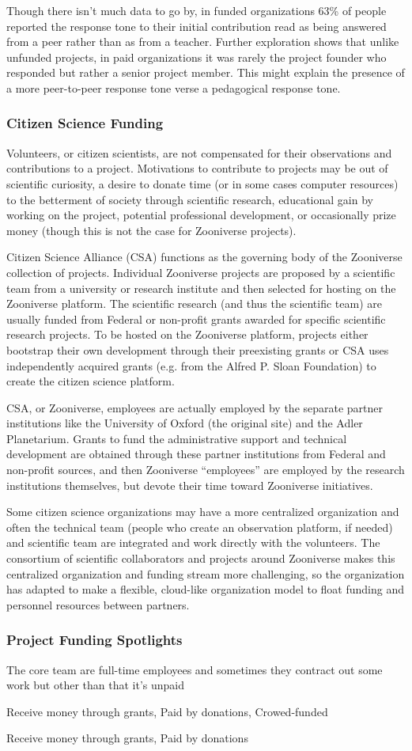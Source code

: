 Though there isn't much data to go by, in funded organizations 63\% of people reported the response tone to their initial contribution read as being answered from a peer rather than as from a teacher. Further exploration shows that unlike unfunded projects, in paid organizations it was rarely the project founder who responded but rather a senior project member. This might explain the presence of a more peer-to-peer response tone verse a pedagogical response tone.

\subsubsection{Citizen Science Funding}
Volunteers, or citizen scientists, are not compensated for their observations and contributions to a project. Motivations to contribute to projects may be out of scientific curiosity, a desire to donate time (or in some cases computer resources) to the betterment of society through scientific research, educational gain by working on the project, potential professional development, or occasionally prize money (though this is not the case for Zooniverse projects).
 
Citizen Science Alliance (CSA) functions as the governing body of the Zooniverse collection of projects. Individual Zooniverse projects are proposed by a scientific team from a university or research institute and then selected for hosting on the Zooniverse platform. The scientific research (and thus the scientific team) are usually funded from Federal or non-profit grants awarded for specific scientific research projects. To be hosted on the Zooniverse platform, projects either bootstrap their own development through their preexisting grants or CSA uses independently acquired grants (e.g. from the Alfred P. Sloan Foundation) to create the citizen science platform.
 
CSA, or Zooniverse, employees are actually employed by the separate partner institutions like the University of Oxford (the original site) and the Adler Planetarium. Grants to fund the administrative support and technical development are obtained through these partner institutions from Federal and non-profit sources, and then Zooniverse “employees” are employed by the research institutions themselves, but devote their time toward Zooniverse initiatives.
 
Some citizen science organizations may have a more centralized organization and often the technical team (people who create an observation platform, if needed) and scientific team are integrated and work directly with the volunteers. The consortium of scientific collaborators and projects around Zooniverse makes this centralized organization and funding stream more challenging, so the organization has adapted to make a flexible, cloud-like organization model to float funding and personnel resources between partners.

\subsubsection{Project Funding Spotlights}

The core team are full-time employees and sometimes they contract out some work but other than that it's unpaid

Receive money through grants, Paid by donations, Crowed-funded

Receive money through grants, Paid by donations